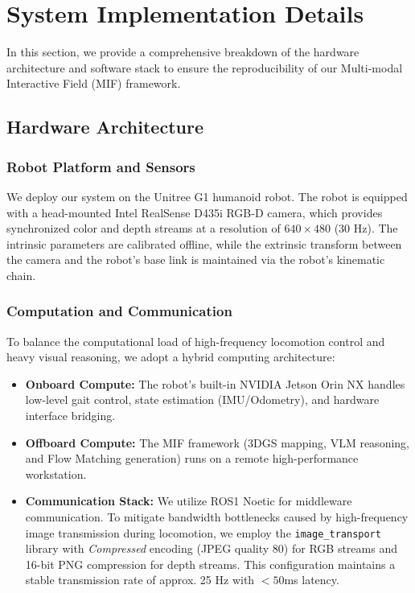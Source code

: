 \documentclass[conference]{IEEEtran}
\begin{document}
\renewcommand{\thesection}{S.\arabic{section}}
\renewcommand{\thesubsection}{S.\arabic{section}-\Alph{subsection}}
\renewcommand{\thetable}{S.\arabic{table}}
\renewcommand{\thefigure}{S.\arabic{figure}}

\clearpage
\section{System Implementation Details}
\label{sec:implementation_details}

In this section, we provide a comprehensive breakdown of the hardware architecture and software stack to ensure the reproducibility of our Multi-modal Interactive Field (MIF) framework.

\subsection{Hardware Architecture}

\subsubsection{Robot Platform and Sensors}
We deploy our system on the Unitree G1 humanoid robot. The robot is equipped with a head-mounted Intel RealSense D435i RGB-D camera, which provides synchronized color and depth streams at a resolution of $640 \times 480$ (30 Hz). The intrinsic parameters are calibrated offline, while the extrinsic transform between the camera and the robot's base link is maintained via the robot's kinematic chain.

\subsubsection{Computation and Communication}
To balance the computational load of high-frequency locomotion control and heavy visual reasoning, we adopt a hybrid computing architecture:

\begin{itemize}
    \item \textbf{Onboard Compute:} The robot's built-in NVIDIA Jetson Orin NX handles low-level gait control, state estimation (IMU/Odometry), and hardware interface bridging.
    \item \textbf{Offboard Compute:} The MIF framework (3DGS mapping, VLM reasoning, and Flow Matching generation) runs on a remote high-performance workstation.
    \item \textbf{Communication Stack:} We utilize ROS1 Noetic for middleware communication. To mitigate bandwidth bottlenecks caused by high-frequency image transmission during locomotion, we employ the \texttt{image\_transport} library with \textit{Compressed} encoding (JPEG quality 80) for RGB streams and 16-bit PNG compression for depth streams. This configuration maintains a stable transmission rate of approx. 25 Hz with $<50$ms latency.
\end{itemize}
\end{document}
